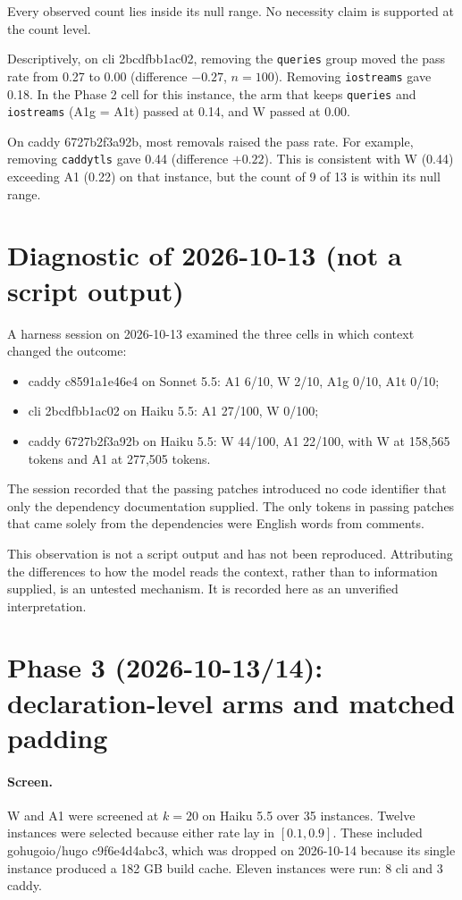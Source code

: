 \documentclass[11pt,a4paper]{article}
\begin{document}
Every observed count lies inside its null range. No necessity claim is supported at the count level.

Descriptively, on cli 2bcdfbb1ac02, removing the \texttt{queries} group moved the pass rate from 0.27 to 0.00 (difference $-0.27$, $n=100$). Removing \texttt{iostreams} gave 0.18. In the Phase 2 cell for this instance, the arm that keeps \texttt{queries} and \texttt{iostreams} (A1g = A1t) passed at 0.14, and W passed at 0.00.

On caddy 6727b2f3a92b, most removals raised the pass rate. For example, removing \texttt{caddytls} gave 0.44 (difference $+0.22$). This is consistent with W (0.44) exceeding A1 (0.22) on that instance, but the count of 9 of 13 is within its null range.

\section{Diagnostic of 2026-10-13 (not a script output)}
\label{sec:diagnostic}

A harness session on 2026-10-13 examined the three cells in which context changed the outcome:
\begin{itemize}
\item caddy c8591a1e46e4 on Sonnet 5.5: A1 6/10, W 2/10, A1g 0/10, A1t 0/10;
\item cli 2bcdfbb1ac02 on Haiku 5.5: A1 27/100, W 0/100;
\item caddy 6727b2f3a92b on Haiku 5.5: W 44/100, A1 22/100, with W at 158,565 tokens and A1 at 277,505 tokens.
\end{itemize}

The session recorded that the passing patches introduced no code identifier that only the dependency documentation supplied. The only tokens in passing patches that came solely from the dependencies were English words from comments.

This observation is not a script output and has not been reproduced. Attributing the differences to how the model reads the context, rather than to information supplied, is an untested mechanism. It is recorded here as an unverified interpretation.

\section{Phase 3 (2026-10-13/14): declaration-level arms and matched padding}

\paragraph{Screen.}
W and A1 were screened at $k=20$ on Haiku 5.5 over 35 instances. Twelve instances were selected because either rate lay in $[0.1, 0.9]$. These included gohugoio/hugo c9f6e4d4abc3, which was dropped on 2026-10-14 because its single instance produced a 182 GB build cache. Eleven instances were run: 8 cli and 3 caddy.
\end{document}
